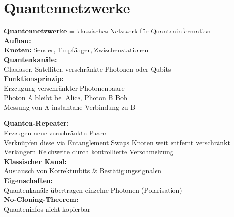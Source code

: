 \section{Quantennetzwerke}
\begin{frame}
	\textbf{Quantennetzwerke} = klassisches Netzwerk für Quanteninformation\\
	\vspace{2em}
	\textbf{Aufbau:}\\
		\hspace{3.2em} \textbf{Knoten:} Sender, Empf{\"a}nger, Zwischenstationen\\
		\hspace{3.2em} \textbf{Quantenkan{\"a}le:}\\
		\hspace{3.2em} Glasfaser, Satelliten \textrightarrow{ }verschr{\"a}nkte Photonen oder Qubits\\
		\hspace{3.2em} \textbf{Funktionsprinzip:}\\
		\hspace{3.2em} Erzeugung verschr{\"a}nkter Photonenpaare \\
		\hspace{3.2em} Photon A bleibt bei Alice, Photon B \textrightarrow{ }Bob\\
		\hspace{3.2em} Messung von A \textrightarrow{ }instantane Verbindung zu B
\end{frame}
\begin{frame}
	\textbf{Quanten-Repeater:}\\
	Erzeugen neue verschr{\"a}nkte Paare\\
	Verknüpfen diese via Entanglement Swaps \textrightarrow{ }Knoten weit entfernt verschr{\"a}nkt\\
	Verl{\"a}ngern Reichweite durch kontrollierte Verschmelzung\\
	\vspace{1em}
	\textbf{Klassischer Kanal:}\\
	Austausch von Korrekturbits \& Best{\"a}tigungssignalen\\
	\vspace{1em}
	\textbf{Eigenschaften:}\\
	Quantenkan{\"a}le übertragen einzelne Photonen (Polarisation)\\
	\vspace{1em}
	\textbf{No-Cloning-Theorem:}\\
	Quanteninfos nicht kopierbar
\end{frame}

